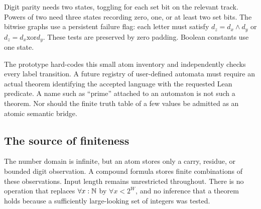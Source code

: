 Digit parity needs two states, toggling for each set bit on the relevant track. Powers of two need three states recording zero, one, or at least two set bits. The bitwise graphs use a persistent failure flag: each letter must satisfy \(d_z=d_x\land d_y\) or \(d_z=d_x\mathbin{\mathrm{xor}}d_y\). These tests are preserved by zero padding. Boolean constants use one state.

The prototype hard-codes this small atom inventory and independently checks every label transition. A future registry of user-defined automata must require an actual theorem identifying the accepted language with the requested Lean predicate. A name such as ``prime'' attached to an automaton is not such a theorem. Nor should the finite truth table of a few values be admitted as an atomic semantic bridge.

\subsection{The source of finiteness}
The number domain is infinite, but an atom stores only a carry, residue, or bounded digit observation. A compound formula stores finite combinations of these observations. Input length remains unrestricted throughout. There is no operation that replaces \(\forall x:\mathbb N\) by \(\forall x<2^W\), and no inference that a theorem holds because a sufficiently large-looking set of integers was tested.
